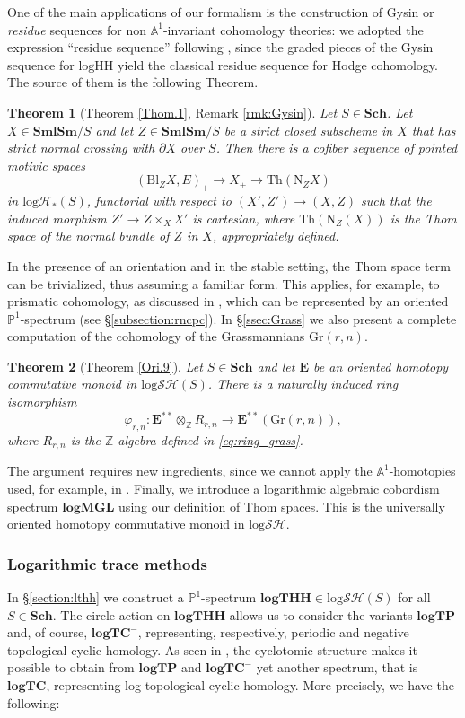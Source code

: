 \documentclass[11pt, a4paper]{amsart}
\newtheorem{thm}{Theorem}[subsection]
\theoremstyle{definition}
\numberwithin{equation}{subsection}
\newcommand{\Z}{\mathbb{Z}}
\renewcommand{\P}{\mathbb{P}}
\newcommand{\A}{\mathbb{A}}
\newcommand{\Sch}{\mathbf{Sch}}
\newcommand{\SmlSm}{\mathbf{SmlSm}}
\newcommand{\Blow}{{\mathrm{Bl}}}
\newcommand{\Normal}{{\mathrm{N}}}
\newcommand{\Gr}{{\mathrm{Gr}}}
\newcommand{\Thom}{\mathrm{Th}}
\newcommand{\spectlogMGL}{{\mathbf{logMGL}}}
\newcommand{\spectlogTHH}{\mathbf{logTHH}}
\newcommand{\logHH}{\mathrm{logHH}}
\newcommand{\spectlogTC}{\mathbf{logTC}}
\newcommand{\spectlogTP}{\mathbf{logTP}}
\newcommand{\ringE}{\mathbf{E}}
\newcommand{\inflogH}{\mathrm{log}\mathcal{H}}
\newcommand{\inflogSH}{\mathrm{log}\mathcal{SH}}
\begin{document}
One of the main applications of our formalism is the construction of Gysin or \emph{residue} sequences for non $\A^1$-invariant cohomology theories: we adopted the expression ``residue sequence'' following \cite{BLPO}, since the graded pieces of the Gysin sequence for $\logHH$ yield the classical residue sequence for Hodge cohomology.   The source of them is the following Theorem.
\begin{thm}[Theorem \ref{Thom.1}, Remark \ref{rmk:Gysin}] Let $S\in \Sch$. Let $X\in \SmlSm/S$ and let $Z\in \SmlSm/S$ be a strict closed subscheme in $X$ that has strict normal crossing with $\partial X$ over $S$. Then there is a cofiber sequence of pointed motivic spaces
\[
(\Blow_Z X,E)_+ \to X_+ \to \Thom(\Normal_Z X)
\]
in $\inflogH_{\ast}(S)$,
functorial with respect to $(X',Z')\to (X,Z)$ such that the induced morphism $Z'\to Z\times_X X'$ is cartesian,
where $\Thom(\Normal_Z(X))$ is the Thom space of the normal bundle of $Z$ in $X$, appropriately defined. 
\end{thm}
In the presence of an orientation and in the stable setting, the
Thom space term can be trivialized, thus assuming a familiar form. This applies, for example, to prismatic cohomology, as discussed in \cite{BLMP}, which can be represented by an oriented $\P^1$-spectrum (see \S\ref{subsection:rncpc}).
In \S \ref{ssec:Grass} we also present a complete computation of the cohomology of the Grassmannians $\Gr(r, n)$. 
\begin{thm}[Theorem \ref{Ori.9}] Let $S\in \Sch$ and let $\ringE$ be an oriented homotopy commutative monoid in $\inflogSH(S)$. 
There is a naturally induced ring isomorphism
\[
\varphi_{r,n}
\colon
\ringE^{**}\otimes_{\Z}R_{r,n}
\to
\ringE^{**}(\Gr(r,n)),
\]
where $R_{r,n}$ is the $\Z$-algebra defined in \eqref{eq:ring_grass}. 
\end{thm}
The argument requires new ingredients, since we cannot apply the $\A^1$-homotopies used, for example, in \cite{zbMATH05663788}. Finally, we introduce a logarithmic algebraic cobordism spectrum $\spectlogMGL$ using our definition of Thom spaces.  This is the universally oriented homotopy commutative monoid in $\inflogSH$.



\subsubsection{Logarithmic trace methods} In \S \ref{section:lthh} we construct a $\P^1$-spectrum $\spectlogTHH\in \inflogSH(S)$
for all $S\in \Sch$. The circle action on $\spectlogTHH$ allows us to consider the variants $\spectlogTP$ and, of course, $\spectlogTC^-$, representing, respectively, periodic and negative topological cyclic homology. As seen in \cite{BLPO2}, the cyclotomic structure makes it possible to obtain from $\spectlogTP$ and $\spectlogTC^-$ yet another spectrum, that is $\spectlogTC$, representing
log topological cyclic homology. More precisely, we have the following: 
\end{document}
